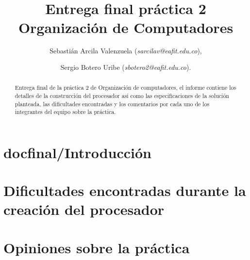 \documentclass[%
	final,
	notitlepage,
	narroweqnarray,
	inline,
	twoside,
	]{ieee}
\begin{document}
\title[Entrega final práctica 2]{%
       Entrega final práctica 2 \\  Organización de Computadores}

\author[]{Sebastián Arcila Valenzuela (\textit{sarcilav@eafit.edu.co}),
\and{} Sergio Botero Uribe (\textit{sbotero2@eafit.edu.co}).
}

\titletext{, \today}

\maketitle               

\begin{abstract} 
Entrega final de la práctica 2 de Organización de computadores, el informe contiene los detalles de la construcción del procesador así como las especificaciones de la solución planteada, las dificultades encontradas y los comentarios por cada uno de los integrantes del equipo sobre la práctica.
\end{abstract}

\section{docfinal/Introducción}
	
	
\section{Dificultades encontradas durante la creación del procesador}
	
	 
\section{Opiniones sobre la práctica}
	
	


\end{document}
